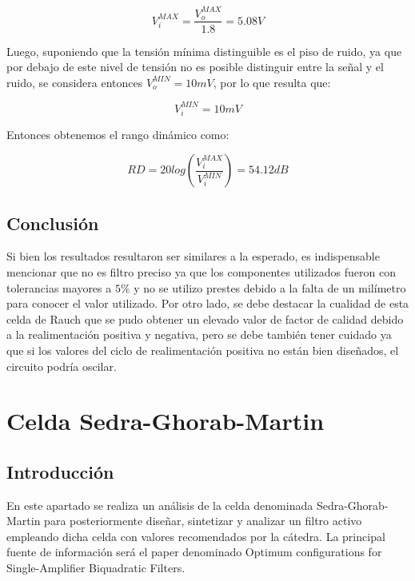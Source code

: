 \begin{equation}
    V_i^{MAX} = \frac{V_o^{MAX}}{1.8} = 5.08V
\end{equation}

Luego, suponiendo que la  tensi\'on m\'inima distinguible es el piso de ruido, ya que por debajo de este nivel de tensi\'on no es posible distinguir entre la se\~nal y el ruido, se considera entonces $V_o^{MIN}=10mV$, por lo que resulta que:

\begin{equation}
    V_i^{MIN} = 10mV
\end{equation}

Entonces obtenemos el rango dinámico como:

\begin{equation}
    RD = 20log(\frac{V_i^{MAX}}{V_i^{MIN}})= 54.12dB
\end{equation}

\subsection{Conclusión}

Si bien los resultados resultaron ser similares a la esperado, es indispensable mencionar que no es filtro preciso ya que los componentes utilizados fueron con tolerancias mayores a $5\%$ y no se utilizo prestes debido a la falta de un milímetro para conocer el valor utilizado. Por otro lado, se debe destacar la cualidad de esta celda de Rauch que se pudo obtener un elevado valor de factor de calidad debido a la realimentación positiva y negativa, pero se debe también tener cuidado ya que si los valores del ciclo de realimentación positiva no están bien diseñados, el circuito podría oscilar.


\section{Celda Sedra-Ghorab-Martin}

\subsection{Introducción}

En este apartado se realiza un análisis de la celda denominada Sedra-Ghorab-Martin para posteriormente diseñar, sintetizar y analizar un filtro activo empleando dicha celda con valores recomendados por la cátedra. La principal fuente de información será el paper denominado Optimum configurations for Single-Amplifier Biquadratic Filters.

